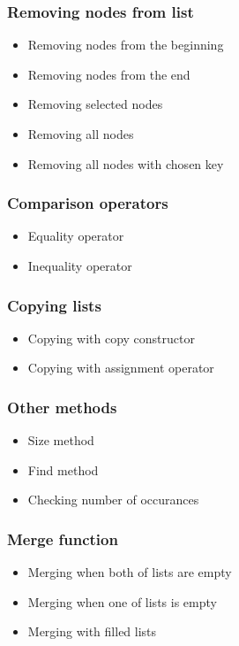 \documentclass{article}
\begin{document}
\subsubsection*{Removing nodes from list}

\begin{itemize}
    \item Removing nodes from the beginning
    \item Removing nodes from the end
    \item Removing selected nodes
    \item Removing all nodes
    \item Removing all nodes with chosen key
\end{itemize}

\subsubsection*{Comparison operators}

\begin{itemize}
    \item Equality operator
    \item Inequality operator
\end{itemize}

\subsubsection*{Copying lists}

\begin{itemize}
    \item Copying with copy constructor
    \item Copying with assignment operator
\end{itemize}

\subsubsection*{Other methods}

\begin{itemize}
    \item Size method
    \item Find method
    \item Checking number of occurances
\end{itemize}

\subsubsection*{Merge function}

\begin{itemize}
    \item Merging when both of lists are empty
    \item Merging when one of lists is empty
    \item Merging with filled lists
\end{itemize}
\end{document}
